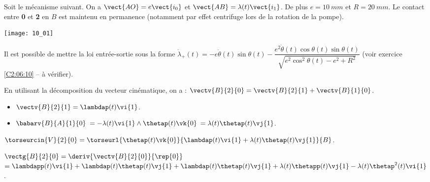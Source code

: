 \normaltrue \difficilefalse \tdifficilefalse
\correctiontrue

\setcounter{question}{0}%
\ifcorrection
\else
{}
\fi

\ifprof
\else
Soit le mécanisme suivant. On a $\vect{AO}=e\vect{i_0}$ et $\vect{AB}=\lambda(t)\vect{i_1}$. De plus $e=\SI{10}{mm}$ et $R=\SI{20}{mm}$. Le contact entre \textbf{0} et \textbf{2} en $B$ est maintenu en permanence (notamment par effet centrifuge lors de la rotation de la pompe).
\begin{marginfigure}
\texttt{[image: 10\_01]}
\end{marginfigure}

Il est possible de mettre la loi entrée-sortie sous la forme 
$ \dot{\lambda}_{+}(t)= -e\dot{\theta}(t)\sin\theta(t)-  \dfrac{ e^2\dot{\theta}(t)\cos\theta(t)\sin\theta(t)}{ \sqrt{e^2\cos^2\theta(t)-e^2+R^2}}$
(voir exercice \ref{C2:06:10} -- à vérifier).

\fi



\ifprof

En utilisant la décomposition du vecteur cinématique, on a :
$\vectv{B}{2}{0} = \vectv{B}{2}{1}+\vectv{B}{1}{0}$.

\begin{itemize}
\item $\vectv{B}{2}{1} = \lambdap(t) \vi{1}$.
\item $\babarv{B}{A}{1}{0}$ $=-\lambda(t)\vi{1}\wedge\thetap(t)\vk{0}$ $=\lambda(t)\thetap(t)\vj{1}$.
\end{itemize}

$\torseurcin{V}{2}{0} = \torseurl{\thetap(t)\vk{0}}{\lambdap(t) \vi{1}+\lambda(t)\thetap(t)\vj{1}}{B}$.

\else
\fi


\ifprof

$\vectg{B}{2}{0} = \deriv{\vectv{B}{2}{0}}{\rep{0}}$
$= \lambdapp(t) \vi{1}+\lambdap(t) \thetap(t) \vj{1}+\lambdap(t)\thetap(t)\vj{1}+\lambda(t)\thetapp(t)\vj{1}-\lambda(t)\thetap^2(t)\vi{1} $.


